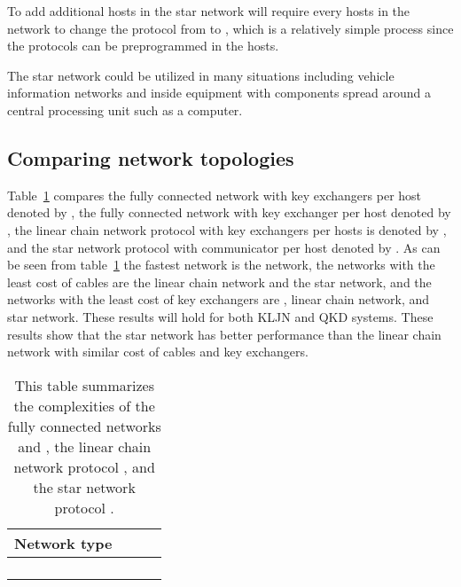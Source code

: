 \documentclass[a4paper,12pt,pdftex]{article}
\begin{document}
To add additional hosts in the star network will require every hosts in the network to change the protocol from  to , which is a relatively simple process since the protocols can be preprogrammed in the hosts.

The star network could be utilized in many situations including vehicle information networks \cite{c181, c185} and inside equipment with components spread around a central processing unit such as a computer.






\subsection{Comparing network topologies}

Table~\ref{table:comp} compares the fully connected network with  key exchangers per host denoted by , the fully connected network with  key exchanger per host denoted by , the linear chain network protocol with  key exchangers per hosts is denoted by , and the star network protocol with  communicator per host denoted by  . As can be seen from table~\ref{table:comp} the fastest network is the  network, the networks with the least cost of cables are the linear chain network and the star network, and the networks with the least cost of key exchangers are , linear chain network, and star network. These results will hold for both KLJN and QKD systems. These results show that the star network has better performance than the linear chain network with similar cost of cables and key exchangers.



\begin{table}[h]
  \begin{center}
    \begin{tabular}{| c | c | c | c |}
    \hline
    Network type &  &  & \\
    \hline
     &  &  &  \\
     &  &  &  \\
     &  &  &  \\
     &  &  &  \\
    \hline
    \end{tabular}
  \end{center}
  \caption{This table summarizes the complexities of the fully connected networks  and , the linear chain network protocol , and the star network protocol .}
  \label{table:comp}
\end{table}
\end{document}
